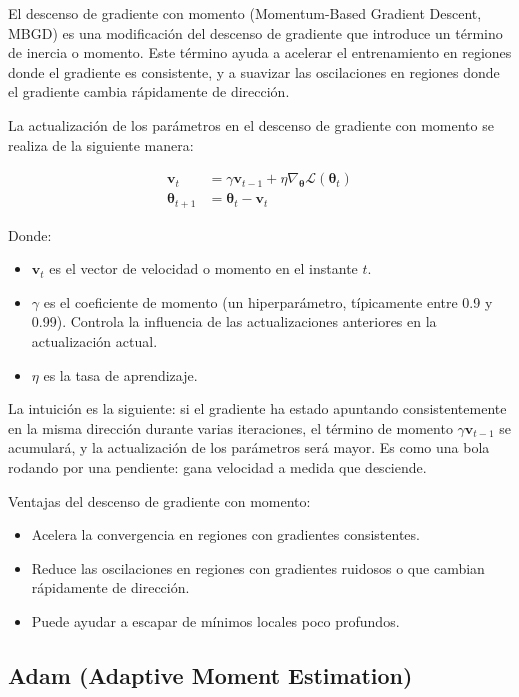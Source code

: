 \documentclass{article}
\begin{document}
El descenso de gradiente con momento (Momentum-Based Gradient Descent, MBGD) es una modificación del descenso de gradiente que introduce un término de inercia o momento.  Este término ayuda a acelerar el entrenamiento en regiones donde el gradiente es consistente, y a suavizar las oscilaciones en regiones donde el gradiente cambia rápidamente de dirección.

La actualización de los parámetros en el descenso de gradiente con momento se realiza de la siguiente manera:

\begin{align*}
\mathbf{v}_t &= \gamma \mathbf{v}_{t-1} + \eta \nabla_{\boldsymbol{\theta}} \mathcal{L}(\boldsymbol{\theta}_t) \\
\boldsymbol{\theta}_{t+1} &= \boldsymbol{\theta}_t - \mathbf{v}_t
\end{align*}

Donde:

\begin{itemize}
    \item \(\mathbf{v}_t\) es el vector de velocidad o momento en el instante \(t\).
    \item \(\gamma\) es el coeficiente de momento (un hiperparámetro, típicamente entre 0.9 y 0.99).  Controla la influencia de las actualizaciones anteriores en la actualización actual.
    \item \(\eta\) es la tasa de aprendizaje.
\end{itemize}

La intuición es la siguiente: si el gradiente ha estado apuntando consistentemente en la misma dirección durante varias iteraciones, el término de momento \(\gamma \mathbf{v}_{t-1}\) se acumulará, y la actualización de los parámetros será mayor.  Es como una bola rodando por una pendiente: gana velocidad a medida que desciende.

Ventajas del descenso de gradiente con momento:

\begin{itemize}
    \item Acelera la convergencia en regiones con gradientes consistentes.
    \item Reduce las oscilaciones en regiones con gradientes ruidosos o que cambian rápidamente de dirección.
    \item Puede ayudar a escapar de mínimos locales poco profundos.
\end{itemize}

\subsection{Adam (Adaptive Moment Estimation)}
\end{document}
